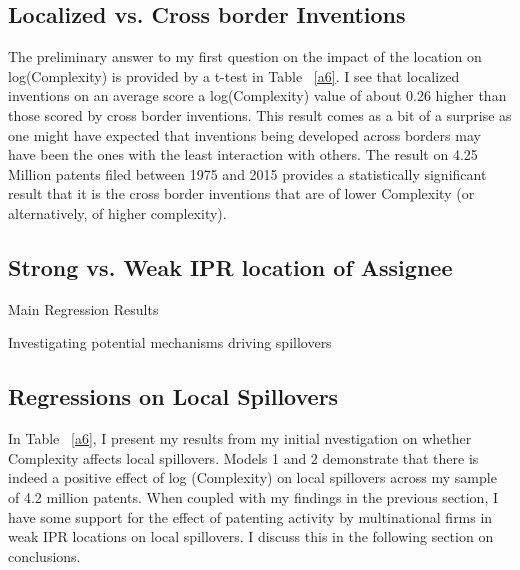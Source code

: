 \documentclass[12pt]{article}
\begin{document}
\subsection{Localized vs. Cross border Inventions}
The preliminary answer to my first question on the impact of the location on log(Complexity) is provided by a t-test in Table ~\ref{a6}. I see that localized inventions on an average score a log(Complexity) value of about 0.26 higher than those scored by cross border inventions. This result comes as a bit of a surprise as one might have expected that inventions being developed across borders may have been the ones with the least interaction with others. The result on 4.25 Million patents filed between 1975 and 2015 provides a statistically significant result that it is the cross border inventions that are of lower Complexity (or alternatively, of higher complexity).


\subsection{Strong vs. Weak IPR location of Assignee}


\begin{table}
\caption{Main Regression Results}
\begin{center}
\begin{spacing}{0.9}

\end{spacing}
\end{center}
\end{table}

\begin{table}
\caption{Investigating potential mechanisms driving spillovers}

\end{table}

\subsection{Regressions on Local Spillovers}
In Table ~\ref{a6}, I present my results from my initial nvestigation on whether Complexity affects local spillovers. Models 1 and 2 demonstrate that there is indeed a positive effect of log (Complexity) on local spillovers across my sample of 4.2 million patents. When coupled with my findings in the previous section, I have some support for the effect of patenting activity by multinational firms in weak IPR locations on local spillovers. I discuss this in the following section on conclusions.
\end{document}
